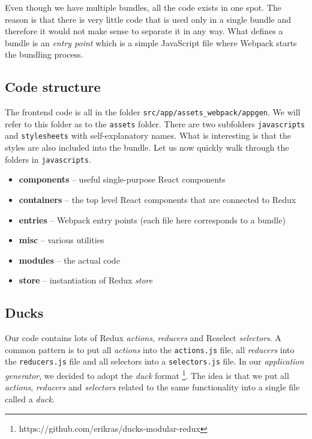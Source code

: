 Even though we have multiple bundles, all the code exists in one spot. The reason is that there is very little code that is used only in a single bundle and therefore it would not make sense to separate it in any way. What defines a bundle is an \emph{entry point} which is a simple JavaScript file where Webpack starts the bundling process.

\subsection{Code structure}

The frontend code is all in the folder \texttt{src/app/assets\_webpack/appgen}. We will refer to this folder as to the \texttt{assets} folder. There are two subfolders \texttt{javascripts} and \texttt{stylesheets} with self-explanatory names. What is interesting is that the styles are also included into the bundle.  Let us now quickly walk through the folders in \texttt{javascripts}.

\begin{itemize}
\item \textbf{components} -- useful single-purpose React components
\item \textbf{containers} -- the top level React components that are connected to Redux
\item \textbf{entries} -- Webpack entry points (each file here corresponds to a bundle)
\item \textbf{misc} -- various utilities
\item \textbf{modules} -- the actual code
\item \textbf{store} -- instantiation of Redux \emph{store}

\end{itemize}
\subsection{Ducks}

Our code contains lots of Redux \emph{actions}, \emph{reducers} and Reselect \emph{selectors}. A common pattern is to put all \emph{actions} into the \texttt{actions.js} file, all \emph{reducers} into the \texttt{reducers.js} file and all selectors into a \texttt{selectors.js} file. In our \emph{application generator}, we decided to adopt the \emph{duck} format \footnote{https://github.com/erikras/ducks-modular-redux}. The idea is that we put all \emph{actions}, \emph{reducers} and \emph{selectors} related to the same functionality into a single file called a \emph{duck}. 

